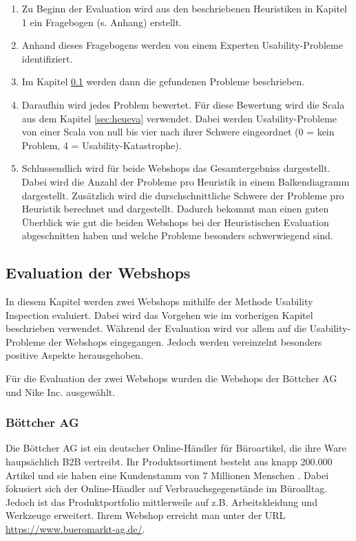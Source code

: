 \documentclass[utf8,biblatex]{lni}
\begin{document}
\begin{enumerate}
  
  \item Zu Beginn der Evaluation wird aus den beschriebenen Heuristiken in Kapitel 1 ein Fragebogen (s. Anhang) erstellt.
  \item Anhand dieses Fragebogens werden von einem Experten Usability-Probleme identifiziert.
  \item Im Kapitel \ref{sec:Evaluation} werden dann die gefundenen Probleme beschrieben.
  \item Daraufhin wird jedes Problem bewertet. Für diese Bewertung wird die Scala aus dem Kapitel \ref{sec:heueva} verwendet. Dabei werden Usability-Probleme von einer Scala von null bis vier nach ihrer Schwere eingeordnet (0 = kein Problem, 4 = Usability-Katastrophe).
  \item Schlussendlich wird für beide Webshops das Gesamtergebniss dargestellt. Dabei wird die Anzahl der Probleme pro Heuristik in einem Balkendiagramm dargestellt. Zusätzlich wird die durschschnittliche Schwere der Probleme pro Heuristik berechnet und dargestellt. 
  Dadurch bekommt man einen guten Überblick wie gut die beiden Webshops bei der Heuristischen Evaluation abgeschnitten haben und welche Probleme besonders schwerwiegend sind.
\end{enumerate}
  

\subsection{Evaluation der Webshops}\label{sec:Evaluation}
In diesem Kapitel werden zwei Webshops mithilfe der Methode Usability Inspection evaluiert. Dabei wird das Vorgehen wie im vorherigen Kapitel beschrieben verwendet. Während der Evaluation wird vor allem auf die Usability-Probleme der Webshops eingegangen. Jedoch werden vereinzelnt besonders positive Aspekte herausgehoben. 

Für die Evaluation der zwei Webshops wurden die Webshops der Böttcher AG und Nike Inc. ausgewählt.


\subsubsection{Böttcher AG}
Die Böttcher AG ist ein deutscher Online-Händler für Büroartikel, die ihre Ware haupsächlich B2B vertreibt. Ihr Produktsortiment besteht aus knapp 200.000 Artikel und sie haben eine Kundenstamm von 7 Millionen Menschen \cite{böttcher}. Dabei fokusiert sich der Online-Händler auf Verbrauchsgegenstände im Büroalltag. Jedoch ist das Produktportfolio mittlerweile auf z.B. Arbeitskleidung und Werkzeuge erweitert. Ihrem Webshop erreicht man unter der URL \url{https://www.bueromarkt-ag.de/}. 
\end{document}
